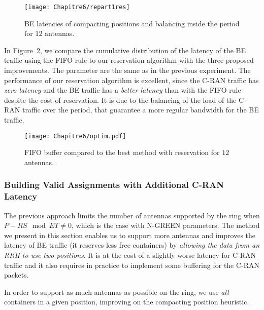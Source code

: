 \begin{figure}[h!]
\begin{center}   
      \texttt{[image: Chapitre6/repart1res]}
     \caption{BE latencies of compacting positions and balancing inside the period for $12$ antennas.}   \label{fig:algocmp}
\end{center}
  \end{figure}
  
In Figure~\ref{fig:optimres}, we compare the cumulative distribution of the latency of the BE traffic using the FIFO rule to our reservation algorithm with the three proposed improvements. The parameter are the same as in the previous experiment. The performance of our reservation algorithm is excellent, since the C-RAN traffic has \emph{zero latency} and the BE traffic has a \emph{better latency} than with the FIFO rule despite the cost of reservation. It is due to the balancing of the load of the C-RAN traffic over the period, that guarantee a more regular bandwidth for the BE traffic.
  

  \begin{figure}[h!]
\begin{center}   
     \texttt{[image: Chapitre6/optim.pdf]}
     \caption{FIFO buffer compared to the best method with reservation for $12$ antennas.} \label{fig:optimres}
\end{center}
  \end{figure}
      
     
\subsubsection{Building Valid Assignments with Additional C-RAN Latency}
\label{sec:maxant}

The previous approach limits the number of antennas supported by the ring when $P-RS \mod ET \neq 0$, which is the case with N-GREEN parameters. The method we present in this section enables us to support more antennas and improves the latency of BE traffic (it reserves less free containers) by \emph{allowing the data from an RRH to use two positions}.
It is at the cost of a slightly worse latency for C-RAN traffic and it also requires in practice to implement some buffering for the C-RAN packets. 

In order to support as much antennas as possible on the ring, we use \emph{all} containers in a given position, improving on the compacting position heuristic. 

